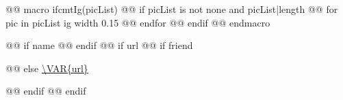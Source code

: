 
@@ macro ifcmtIg(picList)
  @@ if picList is not none and picList|length
\ifcmt
    @@ for pic in picList
  ig 
  width 0.15
    @@ endfor
\fi
  @@ endif
@@ endmacro

@@ if name
@@ endif
@@ if url
  @@ if friend
\par
  @@ else
\url{\VAR{url}}\par
  @@ endif
@@ endif
